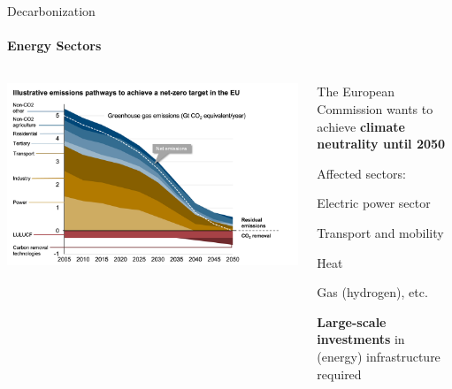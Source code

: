 \documentclass[aspectratio=169]{beamer}
\begin{document}
\begin{frame}{Decarbonization}
    \framesubtitle{Energy Sectors}

    \vspace{-.9cm}
    \begin{columns}
        \begin{column}{0.587\textwidth}
            \begin{coloredblock}[turquoise][][][c][13.7cm]
                \includegraphics[width=\linewidth]{figures/Path_net-zero.png}
            \end{coloredblock}
        \end{column}
        \begin{column}{0.39\textwidth}
            \begin{coloredblockicon}
                \small The European Commission wants to achieve \textbf{climate neutrality until 2050}
            \end{coloredblockicon}
            \begin{coloredblockicon}
                \small Affected sectors:
                \begin{tugitemize}
                    \item \footnotesize Electric power sector
                    \item \footnotesize Transport and mobility
                    \item \footnotesize Heat
                    \item \footnotesize Gas (hydrogen), etc.
                \end{tugitemize}
            \end{coloredblockicon}
            \begin{coloredblockicon}
                \small \textbf{Large-scale investments} in (energy) infrastructure required
            \end{coloredblockicon}
        \end{column}
    \end{columns}


\end{frame}
\end{document}
